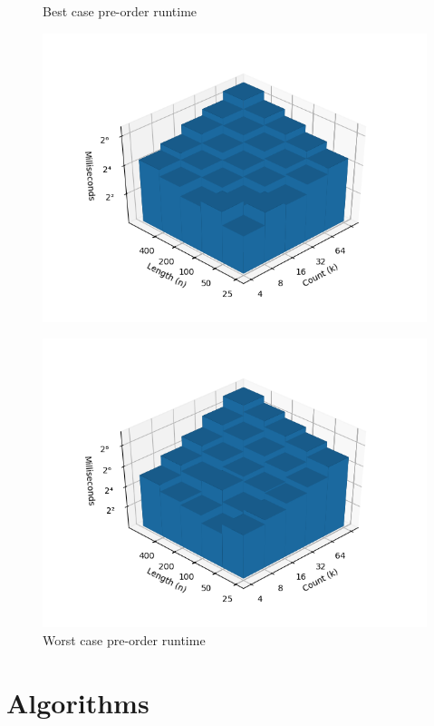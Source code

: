 \documentclass{bmcart}
\begin{document}
\begin{backmatter}
\begin{figure}[h]
		\begin{minipage}{0.48\textwidth}
			\centering
			\caption{Best case pre-order runtime}
			\label{Fig:Best}
			\includegraphics[width=1.1\textwidth]{pathological-12-preorder.png}
		\end{minipage}
		\hfill
		\begin{minipage}{0.48\textwidth}
			\centering
			\caption{Worst case pre-order runtime}
			\label{Fig:Worst}
			\includegraphics[width=1.1\textwidth]{pathological-31-preorder.png}
		\end{minipage}
	\end{figure}

	
	\section*{Algorithms}	
	

\end{backmatter}
\end{document}
